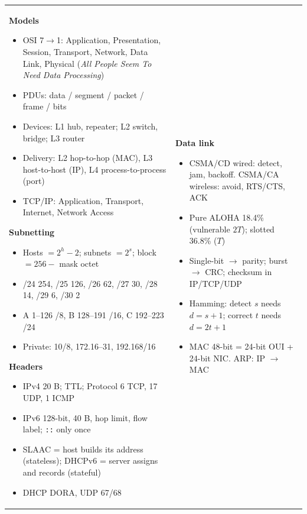 \documentclass[10pt]{article}
\begin{document}
\newpage
\begin{cheatsheet}
\small
\begin{tabularx}{\linewidth}{@{}XX@{}}
\textbf{Models}
\begin{itemize}
\item OSI 7$\to$1: Application, Presentation, Session, Transport, Network, Data Link, Physical (\emph{All People Seem To Need Data Processing})
\item PDUs: data / segment / packet / frame / bits
\item Devices: L1 hub, repeater; L2 switch, bridge; L3 router
\item Delivery: L2 hop-to-hop (MAC), L3 host-to-host (IP), L4 process-to-process (port)
\item TCP/IP: Application, Transport, Internet, Network Access
\end{itemize}
\textbf{Subnetting}
\begin{itemize}
\item Hosts $= 2^h - 2$; subnets $= 2^s$; block $= 256 -$ mask octet
\item /24 254, /25 126, /26 62, /27 30, /28 14, /29 6, /30 2
\item A 1--126 /8, B 128--191 /16, C 192--223 /24
\item Private: 10/8, 172.16--31, 192.168/16
\end{itemize}
\textbf{Headers}
\begin{itemize}
\item IPv4 20 B; TTL; Protocol 6 TCP, 17 UDP, 1 ICMP
\item IPv6 128-bit, 40 B, hop limit, flow label; \texttt{::} only once
\item SLAAC = host builds its address (stateless); DHCPv6 = server assigns and records (stateful)
\item DHCP DORA, UDP 67/68
\end{itemize}
&
\textbf{Data link}
\begin{itemize}
\item CSMA/CD wired: detect, jam, backoff. CSMA/CA wireless: avoid, RTS/CTS, ACK
\item Pure ALOHA 18.4\% (vulnerable $2T$); slotted 36.8\% ($T$)
\item Single-bit $\to$ parity; burst $\to$ CRC; checksum in IP/TCP/UDP
\item Hamming: detect $s$ needs $d = s+1$; correct $t$ needs $d = 2t+1$
\item MAC 48-bit = 24-bit OUI + 24-bit NIC. ARP: IP $\to$ MAC

\end{itemize}
\end{tabularx}
\end{cheatsheet}
\end{document}
